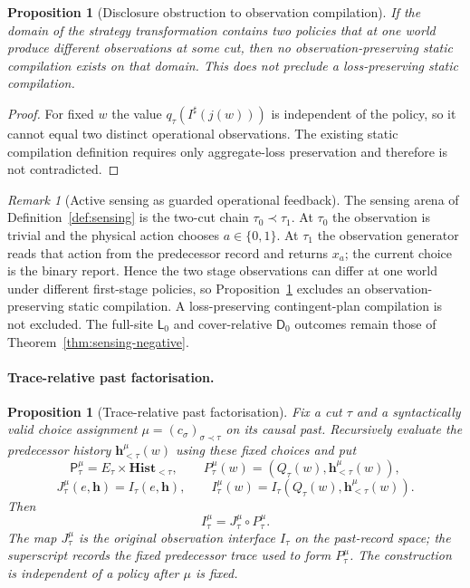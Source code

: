 \documentclass[11pt]{article}
\theoremstyle{plain}
\newtheorem{proposition}[theorem]{Proposition}
\theoremstyle{definition}
\theoremstyle{remark}
\newtheorem{remark}[theorem]{Remark}
\begin{document}
\begin{proposition}[Disclosure obstruction to observation compilation]
\label{prop:observation-compilation-no-go}
If the domain of the strategy transformation contains two policies that at one
world produce different observations at some cut, then no observation-preserving
static compilation exists on that domain. This does not preclude a
loss-preserving static compilation.
\end{proposition}

\begin{proof}
For fixed $w$ the value $q_\tau(I^\sharp(j(w)))$ is independent of the policy,
so it cannot equal two distinct operational observations. The existing static
compilation definition requires only aggregate-loss preservation and therefore
is not contradicted.
\end{proof}


\begin{remark}[Active sensing as guarded operational feedback]
\label{rem:sensing-operational}
The sensing arena of Definition~\ref{def:sensing} is the two-cut chain
$\tau_0\prec\tau_1$. At $\tau_0$ the observation is trivial and the physical
action chooses $a\in\{0,1\}$. At $\tau_1$ the observation generator reads that
action from the predecessor record and returns $x_a$; the current choice is the
binary report. Hence the two stage observations can differ at one world under
different first-stage policies, so
Proposition~\ref{prop:observation-compilation-no-go} excludes an
observation-preserving static compilation. A loss-preserving contingent-plan
compilation is not excluded. The full-site $\mathsf L_0$ and cover-relative
$\mathsf D_0$ outcomes remain those of
Theorem~\ref{thm:sensing-negative}.
\end{remark}

\paragraph{Trace-relative past factorisation.}

\begin{proposition}[Trace-relative past factorisation]
\label{prop:trace-relative-past}
Fix a cut $\tau$ and a syntactically valid choice assignment
$\mu=(c_\sigma)_{\sigma\prec\tau}$ on its causal past. Recursively evaluate the
predecessor history $\mathbf h_{<\tau}^\mu(w)$ using these fixed choices and
put
\[
\mathsf P_\tau^\mu=E_\tau\times\mathbf{Hist}_{<\tau},
\qquad
P_\tau^\mu(w)=(Q_\tau(w),\mathbf h_{<\tau}^\mu(w)),
\]
\[
J_\tau^\mu(e,\mathbf h)=I_\tau(e,\mathbf h),
\qquad
I_\tau^\mu(w)=I_\tau(Q_\tau(w),\mathbf h_{<\tau}^\mu(w)).
\]
Then
\[
I_\tau^\mu=J_\tau^\mu\circ P_\tau^\mu.
\]
The map $J_\tau^\mu$ is the original observation interface $I_\tau$ on the
past-record space; the superscript records the fixed predecessor trace used to
form $P_\tau^\mu$. The construction is independent of a policy after $\mu$ is
fixed.
\end{proposition}
\end{document}
